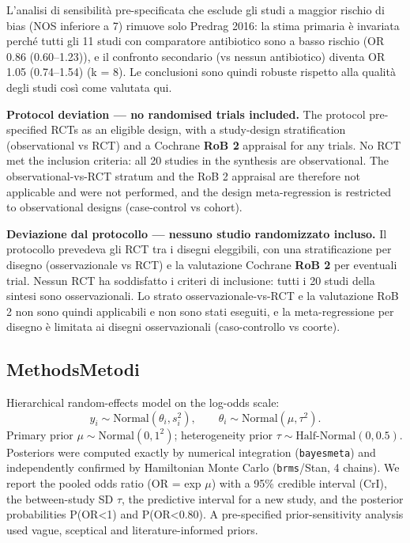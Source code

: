 \documentclass[
  letterpaper,
  DIV=11,
  numbers=noendperiod]{scrartcl}
\begin{document}
L'analisi di sensibilità pre-specificata che esclude gli studi a maggior
rischio di bias (NOS inferiore a 7) rimuove solo Predrag 2016: la stima
primaria è invariata perché tutti gli 11 studi con comparatore
antibiotico sono a basso rischio (OR 0.86 (0.60--1.23)), e il confronto
secondario (vs nessun antibiotico) diventa OR 1.05 (0.74--1.54) (k = 8).
Le conclusioni sono quindi robuste rispetto alla qualità degli studi
così come valutata qui.

\begin{tcolorbox}[enhanced jigsaw, arc=.35mm, bottomrule=.15mm, bottomtitle=1mm, breakable, colback=white, colbacktitle=quarto-callout-note-color!10!white, colframe=quarto-callout-note-color-frame, coltitle=black, left=2mm, leftrule=.75mm, opacityback=0, opacitybacktitle=0.6, rightrule=.15mm, title=\textcolor{quarto-callout-note-color}{\faInfo}\hspace{0.5em}{Note}, titlerule=0mm, toprule=.15mm, toptitle=1mm]

\textbf{Protocol deviation --- no randomised trials included.} The
protocol pre-specified RCTs as an eligible design, with a study-design
stratification (observational vs RCT) and a Cochrane \textbf{RoB 2}
appraisal for any trials. No RCT met the inclusion criteria: all 20
studies in the synthesis are observational. The observational-vs-RCT
stratum and the RoB 2 appraisal are therefore not applicable and were
not performed, and the design meta-regression is restricted to
observational designs (case-control vs cohort).

\textbf{Deviazione dal protocollo --- nessuno studio randomizzato
incluso.} Il protocollo prevedeva gli RCT tra i disegni eleggibili, con
una stratificazione per disegno (osservazionale vs RCT) e la valutazione
Cochrane \textbf{RoB 2} per eventuali trial. Nessun RCT ha soddisfatto i
criteri di inclusione: tutti i 20 studi della sintesi sono
osservazionali. Lo strato osservazionale-vs-RCT e la valutazione RoB 2
non sono quindi applicabili e non sono stati eseguiti, e la
meta-regressione per disegno è limitata ai disegni osservazionali
(caso-controllo vs coorte).

\end{tcolorbox}

\subsection{\texorpdfstring{{Methods}{Metodi}}{MethodsMetodi}}\label{methodsmetodi}

Hierarchical random-effects model on the log-odds scale:
\[y_i \sim \text{Normal}(\theta_i, s_i^2), \qquad \theta_i \sim \text{Normal}(\mu, \tau^2).\]
Primary prior \(\mu \sim \text{Normal}(0, 1^2)\); heterogeneity prior
\(\tau \sim \text{Half-Normal}(0, 0.5)\). Posteriors were computed
exactly by numerical integration (\texttt{bayesmeta}) and independently
confirmed by Hamiltonian Monte Carlo (\texttt{brms}/Stan, 4 chains). We
report the pooled odds ratio (OR = exp \(\mu\)) with a 95\% credible
interval (CrI), the between-study SD \(\tau\), the predictive interval
for a new study, and the posterior probabilities P(OR\textless1) and
P(OR\textless0.80). A pre-specified prior-sensitivity analysis used
vague, sceptical and literature-informed priors.
\end{document}

